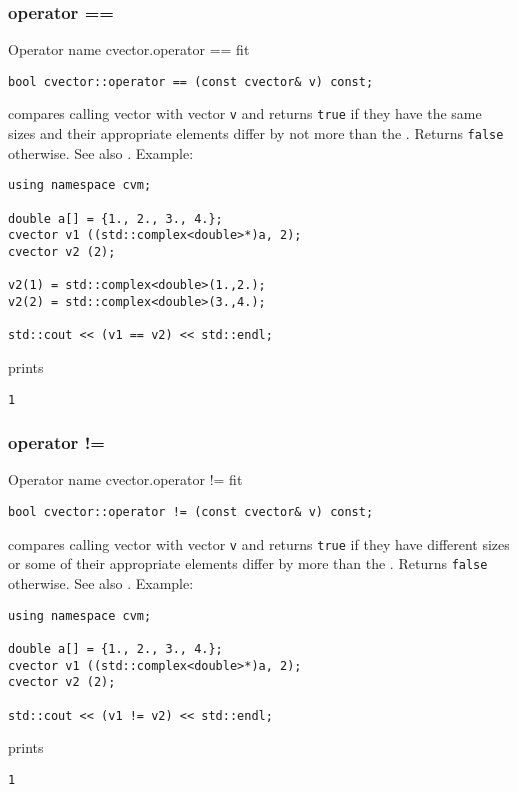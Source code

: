 \subsubsection{operator ==}
Operator%
\pdfdest name {cvector.operator ==} fit
\begin{verbatim}
bool cvector::operator == (const cvector& v) const;
\end{verbatim}
compares  calling vector with  vector \verb"v"
and returns \verb"true" if they have the same sizes
and their appropriate elements differ by not more than the
.
Returns \verb"false" otherwise.
See also .
Example:
\begin{Verbatim}
using namespace cvm;

double a[] = {1., 2., 3., 4.};
cvector v1 ((std::complex<double>*)a, 2);
cvector v2 (2);

v2(1) = std::complex<double>(1.,2.);
v2(2) = std::complex<double>(3.,4.);

std::cout << (v1 == v2) << std::endl;
\end{Verbatim}
prints
\begin{Verbatim}
1
\end{Verbatim}
\newpage



\subsubsection{operator !=}
Operator%
\pdfdest name {cvector.operator !=} fit
\begin{verbatim}
bool cvector::operator != (const cvector& v) const;
\end{verbatim}
compares  calling vector with  vector \verb"v"
and returns \verb"true" if they have different sizes
or some of their appropriate elements
differ by more than the
.
Returns \verb"false" otherwise.
See also .
Example:
\begin{Verbatim}
using namespace cvm;

double a[] = {1., 2., 3., 4.};
cvector v1 ((std::complex<double>*)a, 2);
cvector v2 (2);

std::cout << (v1 != v2) << std::endl;
\end{Verbatim}
prints
\begin{Verbatim}
1
\end{Verbatim}
\newpage



